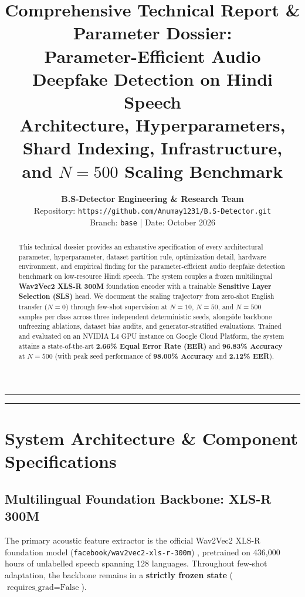 \documentclass[11pt,a4paper]{article}
\title{\textbf{\Large Comprehensive Technical Report \& Parameter Dossier:}\\[0.3em]
\textbf{\large Parameter-Efficient Audio Deepfake Detection on Hindi Speech}\\
\large Architecture, Hyperparameters, Shard Indexing, Infrastructure, and $N=500$ Scaling Benchmark}
\author{\textbf{B.S-Detector Engineering \& Research Team} \\
Repository: \texttt{https://github.com/Anumay1231/B.S-Detector.git} \\
Branch: \texttt{base} \quad | \quad Date: October 2026}
\date{}
\begin{document}
\maketitle

\begin{abstract}
This technical dossier provides an exhaustive specification of every architectural parameter, hyperparameter, dataset partition rule, optimization detail, hardware environment, and empirical finding for the parameter-efficient audio deepfake detection benchmark on low-resource Hindi speech. The system couples a frozen multilingual \textbf{Wav2Vec2 XLS-R 300M} foundation encoder with a trainable \textbf{Sensitive Layer Selection (SLS)} head. We document the scaling trajectory from zero-shot English transfer ($N=0$) through few-shot supervision at $N=10$, $N=50$, and $N=500$ samples per class across three independent deterministic seeds, alongside backbone unfreezing ablations, dataset bias audits, and generator-stratified evaluations. Trained and evaluated on an NVIDIA L4 GPU instance on Google Cloud Platform, the system attains a state-of-the-art \textbf{2.66\% Equal Error Rate (EER)} and \textbf{96.83\% Accuracy} at $N=500$ (with peak seed performance of \textbf{98.00\% Accuracy} and \textbf{2.12\% EER}).
\end{abstract}

\vspace{0.5em}
\hrule
\vspace{0.8em}

\tableofcontents

\vspace{0.8em}
\hrule
\vspace{1.2em}

\section{System Architecture \& Component Specifications}

\subsection{Multilingual Foundation Backbone: XLS-R 300M}
The primary acoustic feature extractor is the official Wav2Vec2 XLS-R foundation model (\texttt{facebook/wav2vec2-xls-r-300m}) \cite{babu2022xls}, pretrained on 436,000 hours of unlabelled speech spanning 128 languages. Throughout few-shot adaptation, the backbone remains in a \textbf{strictly frozen state} ($\text{requires\_grad} = \text{False}$).
\end{document}
